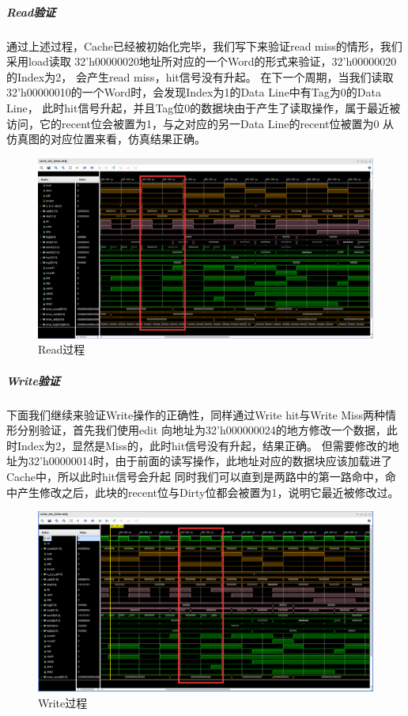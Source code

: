 \subparagraph{Read验证}
通过上述过程，Cache已经被初始化完毕，我们写下来验证read miss的情形，我们采用load读取
32'h00000020地址所对应的一个Word的形式来验证，32'h00000020的Index为2，
会产生read miss，hit信号没有升起。
在下一个周期，当我们读取32'h00000010的一个Word时，会发现Index为1的Data Line中有Tag为0的Data Line，
此时hit信号升起，并且Tag位0的数据块由于产生了读取操作，属于最近被访问，它的recent位会被置为1，与之对应的另一Data Line的recent位被置为0
从仿真图的对应位置来看，仿真结果正确。

\begin{figure}[H] %
	\centering %
	\includegraphics[width=1.0\textwidth]{figs/res3.png} %
	\caption{Read过程} %
	\label{Fig.4} %
\end{figure}

\subparagraph{Write验证}
下面我们继续来验证Write操作的正确性，同样通过Write hit与Write Miss两种情形分别验证，首先我们使用edit
向地址为32'h000000024的地方修改一个数据，此时Index为2，显然是Miss的，此时hit信号没有升起，结果正确。
但需要修改的地址为32'h00000014时，由于前面的读写操作，此地址对应的数据块应该加载进了Cache中，所以此时hit信号会升起
同时我们可以直到是两路中的第一路命中，命中产生修改之后，此块的recent位与Dirty位都会被置为1，说明它最近被修改过。

\begin{figure}[H] %
	\centering %
	\includegraphics[width=1.0\textwidth]{figs/res4.png} %
	\caption{Write过程} %
	\label{Fig.5} %
\end{figure}